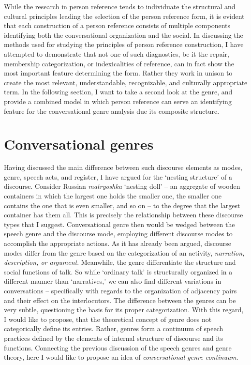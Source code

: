 \documentclass[12pt]{article}
\begin{document}
While the research in person reference tends to individuate the structural and cultural principles leading the selection of the person reference form, it is evident that each construction of a person reference consists of multiple components identifying both the conversational organization and the social. In discussing the methods used for studying the principles of person reference construction, I have attempted to demonstrate that not one of such diagnostics, be it the repair, membership categorization, or indexicalities of reference, can in fact show the most important feature determining the form. Rather they work in unison to create the most relevant, understandable, recognizable, and culturally appropriate term. In the following section, I want to take a second look at the genre, and provide a combined model in which person reference can serve an identifying feature for the conversational genre analysis due its composite structure. 
\section{Conversational genres}
Having discussed the main difference between such discourse elements as modes, genre, speech acts, and register, I have argued for the `nesting structure' of a discourse. Consider Russian \textit{matryoshka} `nesting doll' -- an aggregate of wooden containers in which the largest one holds the smaller one, the smaller one contains the one that is even smaller, and so on -- to the degree that the largest container has them all. This is precisely the relationship between these discourse types that I suggest. Conversational genre then would be wedged between the speech genre and the discourse mode, employing different discourse modes to accomplish the appropriate actions. As it has already been argued, discourse modes differ from the genre based on the categorization of an activity, \textit{narration, description, or argument}. Meanwhile, the genre differentiate the structure and social functions of talk. So while `ordinary talk' is structurally organized in a different manner than `narratives,' we can also find different variations in conversations -- specifically with regards to the organization of adjacency pairs and their effect on the interlocutors. The difference between the genres can be very subtle, questioning the basis for its proper categorization. With this regard, I would like to propose, that the theoretical concept of genre does not categorically define its entries. Rather, genres form a continuum of speech practices defined by the elements of internal structure of discourse and its functions. 
Connecting the previous discussion of the speech genres and genre theory, here I would like to propose an idea of \textit{conversational genre continuum}. 
\end{document}
